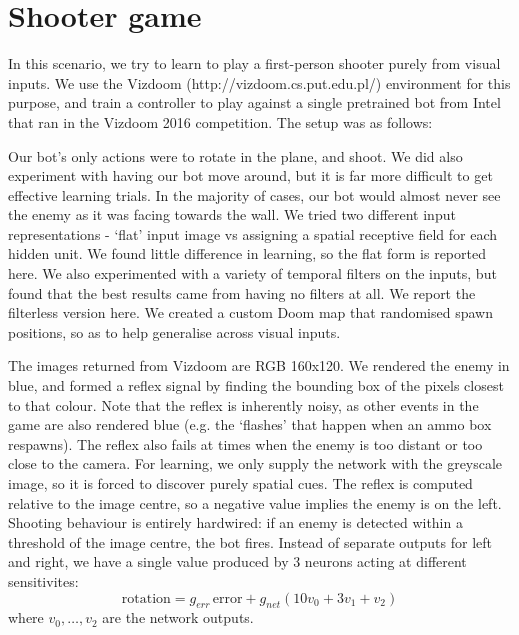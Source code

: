 \documentclass{llncs}
\begin{document}
\section{Shooter game}

In this scenario, we try to learn to play a first-person shooter purely from visual inputs. We use the Vizdoom (http://vizdoom.cs.put.edu.pl/) environment for this purpose, and train a controller to play against a single pretrained bot from Intel that ran in the Vizdoom 2016 competition. The setup was as follows:

Our bot’s only actions were to rotate in the plane, and shoot. We did also experiment with having our bot move around, but it is far more difficult to get effective learning trials. In the majority of cases, our bot would almost never see the enemy as it was facing towards the wall. We tried two different input representations - ‘flat’ input image vs assigning a spatial receptive field for each hidden unit. We found little difference in learning, so the flat form is reported here. We also experimented with a variety of temporal filters on the inputs, but found that the best results came from having no filters at all. We report the filterless version here. We created a custom Doom map that randomised spawn positions, so as to help generalise across visual inputs.

The images returned from Vizdoom are RGB 160x120. We rendered the enemy in blue, and formed a reflex signal by finding the bounding box of the pixels closest to that colour. Note that the reflex is inherently noisy, as other events in the game are also rendered blue (e.g. the ‘flashes’ that happen when an ammo box respawns). The reflex also fails at times when the enemy is too distant or too close to the camera. For learning, we only supply the network with the greyscale image, so it is forced to discover purely spatial cues. The reflex is computed relative to the image centre, so a negative value implies the enemy is on the left. Shooting behaviour is entirely hardwired: if an enemy is detected within a threshold of the image centre, the bot fires. Instead of separate outputs for left and right, we have a single value produced by 3 neurons acting at different sensitivites:
\begin{equation}
\mathrm{rotation} = g_{err}\, \mathrm{error} + g_{net} \left( 10 v_0 + 3 v_1 + v_2 \right)
\end{equation}
where $v_0, \ldots, v_2$ are the network outputs.
\end{document}
